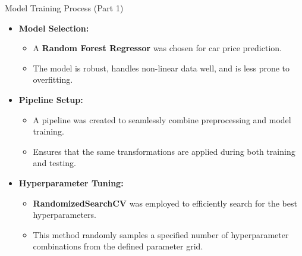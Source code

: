 \documentclass{beamer}
\begin{document}
\begin{frame}{Model Training Process (Part 1)}
    \begin{itemize}
        \item \textbf{Model Selection:}
        \begin{itemize}
            \item A \textbf{Random Forest Regressor} was chosen for car price prediction.
            \item The model is robust, handles non-linear data well, and is less prone to overfitting.
        \end{itemize}
        
        \item \textbf{Pipeline Setup:}
        \begin{itemize}
            \item A pipeline was created to seamlessly combine preprocessing and model training.
            \item Ensures that the same transformations are applied during both training and testing.
        \end{itemize}
        
        \item \textbf{Hyperparameter Tuning:}
        \begin{itemize}
            \item \textbf{RandomizedSearchCV} was employed to efficiently search for the best hyperparameters.
            \item This method randomly samples a specified number of hyperparameter combinations from the defined parameter grid.
        \end{itemize}
    \end{itemize}
\end{frame}
\end{document}
